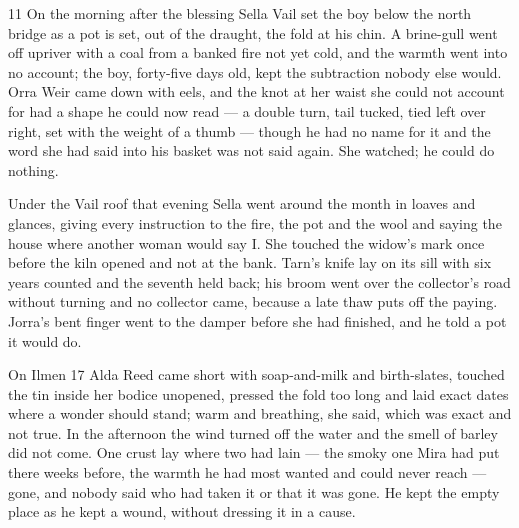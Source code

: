 
\scenebreak



\scenebreak

\CRtailpiece
\begin{CRchronicle}{11}
On the morning after the blessing Sella Vail set the boy below the north bridge as a pot is set, out of the draught, the fold at his chin. A brine-gull went off upriver with a coal from a banked fire not yet cold, and the warmth went into no account; the boy, forty-five days old, kept the subtraction nobody else would. Orra Weir came down with eels, and the knot at her waist she could not account for had a shape he could now read --- a double turn, tail tucked, tied left over right, set with the weight of a thumb --- though he had no name for it and the word she had said into his basket was not said again. She watched; he could do nothing.

Under the Vail roof that evening Sella went around the month in loaves and glances, giving every instruction to the fire, the pot and the wool and saying the house where another woman would say I. She touched the widow’s mark once before the kiln opened and not at the bank. Tarn’s knife lay on its sill with six years counted and the seventh held back; his broom went over the collector’s road without turning and no collector came, because a late thaw puts off the paying. Jorra’s bent finger went to the damper before she had finished, and he told a pot it would do.

On Ilmen 17 Alda Reed came short with soap-and-milk and birth-slates, touched the tin inside her bodice unopened, pressed the fold too long and laid exact dates where a wonder should stand; warm and breathing, she said, which was exact and not true. In the afternoon the wind turned off the water and the smell of barley did not come. One crust lay where two had lain --- the smoky one Mira had put there weeks before, the warmth he had most wanted and could never reach --- gone, and nobody said who had taken it or that it was gone. He kept the empty place as he kept a wound, without dressing it in a cause.


\end{CRchronicle}

